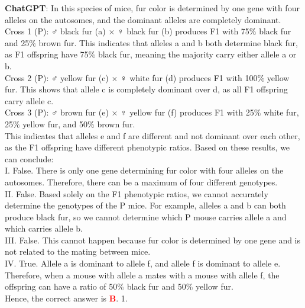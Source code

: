 \documentclass{article}
\begin{document}
{\begin{mdframed}[linewidth=1pt,linecolor=red]
		\textbf{ChatGPT}: In this species of mice, fur color is determined by one gene with four alleles on the autosomes, and the dominant alleles are completely dominant.\\
		Cross 1 (P): $\male$ black fur (a) $\times$ $\female$ black fur (b) produces F1 with 75$\%$ black fur and 25$\%$ brown fur. This indicates that alleles a and b both determine black fur, as F1 offspring have 75$\%$ black fur, meaning the majority carry either allele a or b.\\
		Cross 2 (P): $\male$ yellow fur (c) $\times$ $\female$ white fur (d) produces F1 with 100$\%$ yellow fur.
		This shows that allele c is completely dominant over d, as all F1 offspring carry allele c.\\
		Cross 3 (P): $\male$ brown fur (e) $\times$ $\female$ yellow fur (f) produces F1 with 25$\%$ white fur, 25$\%$ yellow fur, and 50$\%$ brown fur.\\
		This indicates that alleles e and f are different and not dominant over each other, as the F1 offspring have different phenotypic ratios.
		Based on these results, we can conclude:\\
		I. False. There is only one gene determining fur color with four alleles on the autosomes. Therefore, there can be a maximum of four different genotypes.\\
		II. False. Based solely on the F1 phenotypic ratios, we cannot accurately determine the genotypes of the P mice. For example, alleles a and b can both produce black fur, so we cannot determine which P mouse carries allele a and which carries allele b.\\
		III. False. This cannot happen because fur color is determined by one gene and is not related to the mating between mice.\\
		IV. True. Allele a is dominant to allele f, and allele f is dominant to allele e. Therefore, when a mouse with allele a mates with a mouse with allele f, the offspring can have a ratio of 50$\%$ black fur and 50$\%$ yellow fur.\\
		Hence, the correct answer is \textcolor{red}{\textbf{B}}. 1.
		

\end{mdframed}}
\end{document}
